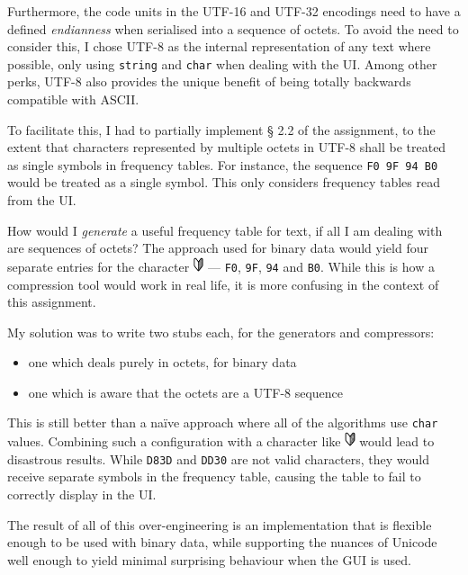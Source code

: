 \documentclass[a4paper,12pt]{article}
\begin{document}
Furthermore, the code units in the UTF-16 and UTF-32 encodings need to have a
defined \emph{endianness} when serialised into a sequence of octets. To avoid
the need to consider this, I chose UTF-8 as the internal representation of any
text where possible, only using \texttt{string} and \texttt{char} when dealing
with the UI. Among other perks, UTF-8 also provides the unique benefit of
being totally backwards compatible with ASCII.

To facilitate this, I had to partially implement § 2.2 of the assignment, to
the extent that characters represented by multiple octets in UTF-8 shall be
treated as single symbols in frequency tables. For instance, the sequence
\texttt{F0 9F 94 B0} would be treated as a single symbol. This only considers
frequency tables read from the UI.

How would I \emph{generate} a useful frequency table for text, if all I am
dealing with are sequences of octets? The approach used for binary data would
yield four separate entries for the character \includegraphics[height=12pt]
{U+01F530.png} --- \texttt{F0}, \texttt{9F}, \texttt{94} and \texttt{B0}. While
this is how a compression tool would work in real life, it is more confusing in
the context of this assignment.

My solution was to write two stubs each, for the generators and compressors:

\begin{itemize}
	\item
		one which deals purely in octets, for binary data
	\item
		one which is aware that the octets are a UTF-8 sequence
\end{itemize}

This is still better than a naïve approach where all of the algorithms use
\texttt{char} values. Combining such a configuration with a character like
\includegraphics[height=12pt]{U+01F530.png} would lead to disastrous results.
While \texttt{D83D} and \texttt{DD30} are not valid characters, they would
receive separate symbols in the frequency table, causing the table to fail to
correctly display in the UI.

The result of all of this over-engineering is an implementation that is
flexible enough to be used with binary data, while supporting the nuances of
Unicode well enough to yield minimal surprising behaviour when the GUI is used.
\end{document}
